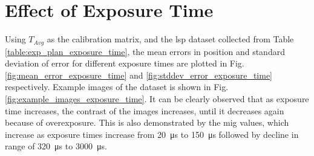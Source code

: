 


\clearpage

\section{Effect of Exposure Time} \label{section:effect_of_exp_time}
    Using $T_{Avg}$ as the calibration matrix, and the \gls{lsp} dataset collected from Table \ref{table:exp_plan_exposure_time}, the mean errors in position and standard deviation of error for different exposure times are plotted in Fig. \ref{fig:mean_error_exposure_time} and \ref{fig:stddev_error_exposure_time} respectively. Example images of the dataset is shown in Fig. \ref{fig:example_images_exposure_time}. It can be clearly observed that as exposure time increases, the contrast of the images increases, until it decreases again because of overexposure. This is also demonstrated by the \gls{mig} values, which increase as exposure times increase from \SI{20}{\micro\second} to \SI{150}{\micro\second} followed by decline in range of \SI{320}{\micro\second} to \SI{3000}{\micro\second}. 

